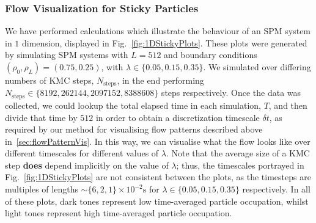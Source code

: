 \subsubsection{Flow Visualization for Sticky Particles} \label{sec:1DStickyPlots}
We have performed calculations which illustrate the behaviour of an SPM system in $1$ dimension, displayed
in Fig.~\ref{fig:1DStickyPlots}. These plots were generated by simulating SPM systems with $L=512$
and boundary conditions $(\rho_0 , \rho_L) = (0.75, 0.25)$, with $\lambda \in \{ 0.05, 0.15, 0.35 \}$.
We simulated over differing numbers of KMC steps, $N_\mathrm{steps}$, in the end performing
$N_\mathrm{steps} \in \{ 8192, 262144, 2097152, 8388608 \}$ steps respectively. Once the data was collected,
we could lookup the total elapsed time in each simulation, $T$, and then divide that time by $512$ in order
to obtain a discretization timescale $\delta t$, as required by our method for visualising flow patterns
described above in~\ref{sec:flowPatternVis}. In this way, we can visualise what the flow looks like over
different timescales for different values of $\lambda$. Note that the average size of a KMC step \textbf{does}
depend
implicitly on the value of $\lambda$; thus, the timescales portrayed in Fig.~\ref{fig:1DStickyPlots}
are not consistent between the plots, as the timesteps are multiples of lengths 
$\sim \{ 6, 2, 1 \}\times 10^{-2} \mathrm{s}$ for $\lambda \in \{ 0.05, 0.15, 0.35 \} $ respectively. In
all of these plots, dark tones represent low time-averaged particle occupation, whilst light tones
represent high time-averaged particle occupation.
